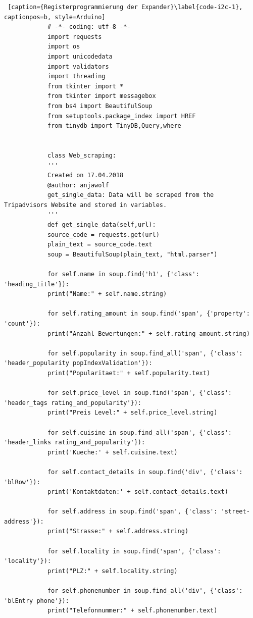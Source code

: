 \documentclass[a4paper,oneside,12pt]{report}
\begin{document}
			\begin{lstlisting} [caption={Registerprogrammierung der Expander}\label{code-i2c-1}, captionpos=b, style=Arduino]
			# -*- coding: utf-8 -*-
			import requests
			import os
			import unicodedata
			import validators
			import threading
			from tkinter import *
			from tkinter import messagebox
			from bs4 import BeautifulSoup
			from setuptools.package_index import HREF
			from tinydb import TinyDB,Query,where
			
			
			class Web_scraping:
			'''
			Created on 17.04.2018
			@author: anjawolf
			get_single_data: Data will be scraped from the Tripadvisors Website and stored in variables.
			'''
			def get_single_data(self,url):
			source_code = requests.get(url)
			plain_text = source_code.text
			soup = BeautifulSoup(plain_text, "html.parser")
			
			for self.name in soup.find('h1', {'class': 'heading_title'}):
			print("Name:" + self.name.string)
			
			for self.rating_amount in soup.find('span', {'property': 'count'}):
			print("Anzahl Bewertungen:" + self.rating_amount.string)
			
			for self.popularity in soup.find_all('span', {'class': 'header_popularity popIndexValidation'}):
			print("Popularitaet:" + self.popularity.text)
			
			for self.price_level in soup.find('span', {'class': 'header_tags rating_and_popularity'}):
			print("Preis Level:" + self.price_level.string)
			
			for self.cuisine in soup.find_all('span', {'class': 'header_links rating_and_popularity'}):
			print('Kueche:' + self.cuisine.text)
			
			for self.contact_details in soup.find('div', {'class': 'blRow'}):
			print('Kontaktdaten:' + self.contact_details.text)
			
			for self.address in soup.find('span', {'class': 'street-address'}):
			print("Strasse:" + self.address.string)
			
			for self.locality in soup.find('span', {'class': 'locality'}):
			print("PLZ:" + self.locality.string)
			
			for self.phonenumber in soup.find_all('div', {'class': 'blEntry phone'}):
			print("Telefonnummer:" + self.phonenumber.text)
			
						     
			\end{lstlisting}
	
	
	
	
	\clearpage
	\listoffigures
	
\end{document}
